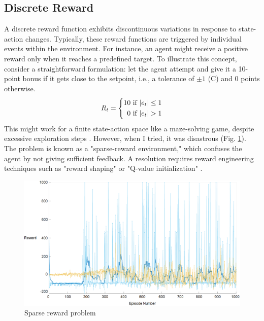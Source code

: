 \documentclass[../main.tex]{subfiles}
\begin{document}
\subsection{Discrete Reward}
A discrete reward function exhibits discontinuous variations in response to state-action changes. Typically, these reward functions are triggered by individual events within the environment. For instance, an agent might receive a positive reward only when it reaches a predefined target. To illustrate this concept, consider a straightforward formulation: let the agent attempt and give it a 10-point bonus if it gets close to the setpoint, i.e., a tolerance of $\pm 1$ (\degree C) and 0 points otherwise.
\begin{equation}
    R_t = \left\{ \begin{aligned}
        10 & \text{ if $\abs{e_t} \le 1$} \\
         0 & \text{ if $\abs{e_t} > 1$}
    \end{aligned}\right.
\end{equation}
This might work for a finite state-action space like a maze-solving game, despite excessive exploration steps \cite{hare2019dealing}. However, when I tried, it was disastrous (Fig. \ref{fig:sparse_rwd}). The problem is known as a "sparse-reward environment," which confuses the agent by not giving sufficient feedback. A resolution requires reward engineering techniques such as "reward shaping" \cite{Ng1999PolicyIU, miller2023rewardshaping} or "Q-value initialization" \cite{eric03rwd}. 
\begin{figure}[htbp]
    \centering
    \includegraphics[width=1\linewidth]{figures/sparse_rwd.png}
    \caption{Sparse reward problem}
    \label{fig:sparse_rwd}
\end{figure}
\end{document}
